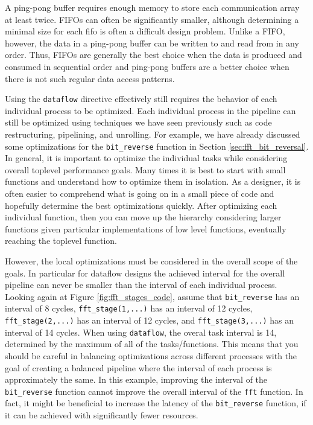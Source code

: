 A ping-pong buffer requires enough memory to store each communication array at least twice.   FIFOs can often be significantly smaller, although determining a minimal size for each fifo is often a difficult design problem.  Unlike a FIFO, however, the data in a ping-pong buffer can be written to and read from in any order. Thus, FIFOs are generally the best choice when the data is produced and consumed in sequential order and ping-pong buffers are a better choice when there is not such regular data access patterns.

Using the \lstinline{dataflow} directive effectively still requires the behavior of each individual process to be optimized. Each individual process in the pipeline can still be optimized using techniques we have seen previously such as code restructuring, pipelining, and unrolling.  For example, we have already discussed some optimizations for the \lstinline{bit_reverse} function in Section \ref{sec:fft_bit_reversal}.  In general, it is important to optimize the individual tasks while considering overall toplevel performance goals. Many times it is best to start with small functions and understand how to optimize them in isolation. As a designer, it is often easier to comprehend what is going on in a small piece of code and hopefully determine the best optimizations quickly. After optimizing each individual function, then you can move up the hierarchy considering larger functions given particular implementations of low level functions, eventually reaching the toplevel function.

However, the local optimizations must be considered in the overall scope of the goals. In particular for dataflow designs the achieved interval for the overall pipeline can never be smaller than the interval of each individual process. Looking again at Figure \ref{fig:fft_stages_code}, assume that \lstinline{bit_reverse} has an interval of 8 cycles, \lstinline{fft_stage(1,...)} has an interval of 12 cycles, \lstinline{fft_stage(2,...)} has an interval of 12 cycles, and \lstinline{fft_stage(3,...)} has an interval of 14 cycles. When using \lstinline{dataflow}, the overal task interval is 14, determined by the maximum of all of the tasks/functions. This means that you should be careful in balancing optimizations across different processes with the goal of creating a balanced pipeline where the interval of each process is approximately the same. In this example, improving the interval of the \lstinline{bit_reverse} function cannot improve the overall interval of the \lstinline|fft| function. In fact, it might be beneficial to increase the latency of the \lstinline{bit_reverse} function, if it can be achieved with significantly fewer resources.

